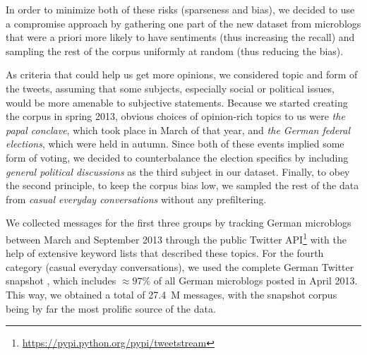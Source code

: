 In order to minimize both of these risks (sparseness and bias), we
decided to use a compromise approach by gathering one part of the new
dataset from microblogs that were a priori more likely to have
sentiments (thus increasing the recall) and sampling the rest of the
corpus uniformly at random (thus reducing the bias).

As criteria that could help us get more opinions, we considered topic
and form of the tweets, assuming that some subjects, especially social
or political issues, would be more amenable to subjective statements.
Because we started creating the corpus in spring 2013, obvious choices
of opinion-rich topics to us were \emph{the papal conclave}, which
took place in March of that year, and \emph{the German federal
  elections}, which were held in autumn.  Since both of these events
implied some form of voting, we decided to counterbalance the election
specifics by including \emph{general political discussions} as the
third subject in our dataset.  Finally, to obey the second principle,
\ie{} to keep the corpus bias low, we sampled the rest of the data
from \emph{casual everyday conversations} without any prefiltering.

We collected messages for the first three groups by tracking German
microblogs between March and September 2013 through the public Twitter
API\footnote{\url{https://pypi.python.org/pypi/tweetstream}} with the
help of extensive keyword lists that described these topics.  For the
fourth category (casual everyday conversations), we used the complete
German Twitter snapshot \cite{Scheffler:14}, which includes
$\approx97\%$ of all German microblogs posted in April 2013.  This
way, we obtained a total of 27.4~M messages, with the snapshot corpus
being by far the most prolific source of the data.


